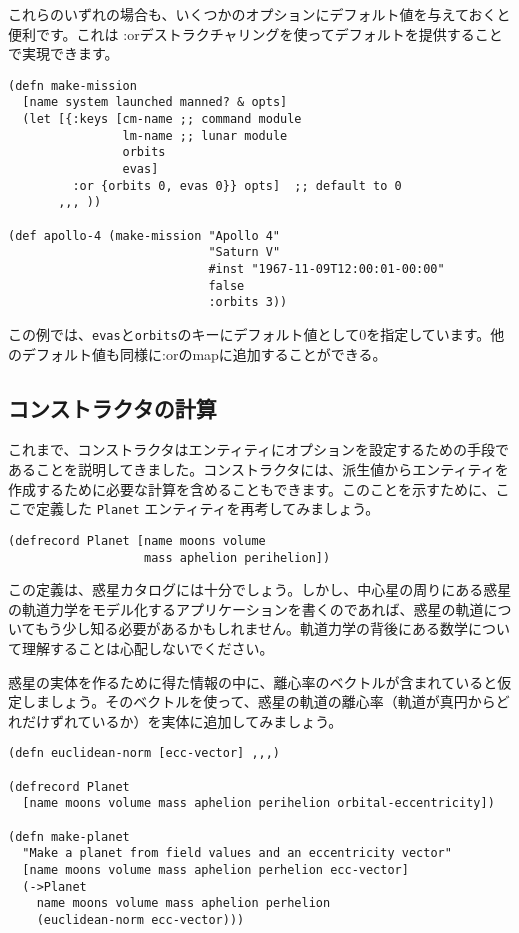 これらのいずれの場合も、いくつかのオプションにデフォルト値を与えておくと便利です。これは :orデストラクチャリングを使ってデフォルトを提供することで実現できます。

\begin{lstlisting}[numbers=none]
(defn make-mission
  [name system launched manned? & opts]
  (let [{:keys [cm-name ;; command module
                lm-name ;; lunar module
                orbits
                evas]
         :or {orbits 0, evas 0}} opts]  ;; default to 0
       ,,, ))

(def apollo-4 (make-mission "Apollo 4"
                            "Saturn V"
                            #inst "1967-11-09T12:00:01-00:00"
                            false
                            :orbits 3))
\end{lstlisting}

この例では、\texttt{evas}と\texttt{orbits}のキーにデフォルト値として0を指定しています。他のデフォルト値も同様に:orのmapに追加することができる。

\subsection{コンストラクタの計算}

これまで、コンストラクタはエンティティにオプションを設定するための手段であることを説明してきました。コンストラクタには、派生値からエンティティを作成するために必要な計算を含めることもできます。このことを示すために、ここで定義した \texttt{Planet} エンティティを再考してみましょう。

\begin{lstlisting}[numbers=none]
(defrecord Planet [name moons volume
                   mass aphelion perihelion])
\end{lstlisting}


この定義は、惑星カタログには十分でしょう。しかし、中心星の周りにある惑星の軌道力学をモデル化するアプリケーションを書くのであれば、惑星の軌道についてもう少し知る必要があるかもしれません。軌道力学の背後にある数学について理解することは心配しないでください。

惑星の実体を作るために得た情報の中に、離心率のベクトルが含まれていると仮定しましょう。そのベクトルを使って、惑星の軌道の離心率（軌道が真円からどれだけずれているか）を実体に追加してみましょう。


\begin{lstlisting}[numbers=none]
(defn euclidean-norm [ecc-vector] ,,,)

(defrecord Planet
  [name moons volume mass aphelion perihelion orbital-eccentricity])

(defn make-planet
  "Make a planet from field values and an eccentricity vector"
  [name moons volume mass aphelion perhelion ecc-vector]
  (->Planet
    name moons volume mass aphelion perhelion
    (euclidean-norm ecc-vector)))
\end{lstlisting}

